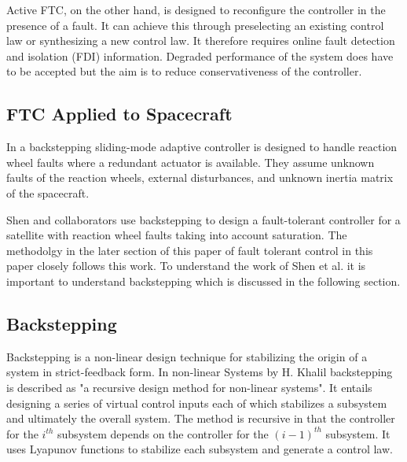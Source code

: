 Active FTC, on the other hand, is designed to reconfigure the controller in the presence of a fault. It can achieve this through preselecting an existing control law or synthesizing a new control law. It therefore requires online fault detection and isolation (FDI) information. Degraded performance of the system does have to be accepted but the aim is to reduce conservativeness of the controller. \cite{yinReviewRecentDevelopment2016}

\subsection{FTC Applied to Spacecraft}
In \cite{jiangAdaptiveBacksteppingFaulttolerant2010} a backstepping sliding-mode adaptive controller is designed to handle reaction wheel faults where a redundant actuator is available. They assume unknown faults of the reaction wheels, external disturbances, and unknown inertia matrix of the spacecraft. 

Shen and collaborators \cite{shenActiveFaulttolerantControl2019} use backstepping to design a fault-tolerant controller for a satellite with reaction wheel faults taking into account saturation. The methodolgy in the later section of this paper of fault tolerant control in this paper closely follows this work. To understand the work of Shen et al. \cite{shenActiveFaulttolerantControl2019} it is important to understand backstepping which is discussed in the following section.

\subsection{Backstepping}
Backstepping is a non-linear design technique for stabilizing the origin of a system in strict-feedback form.
In non-linear Systems by H. Khalil \cite{khalilNonlinearSystems2002} backstepping is described as "a recursive design method for non-linear systems". It entails designing a series of virtual control inputs each of which stabilizes a subsystem and ultimately the overall system. The method is recursive in that the controller for the $i^{th}$ subsystem depends on the controller for the $(i-1)^{th}$ subsystem. It uses Lyapunov functions to stabilize each subsystem and generate a control law. 

